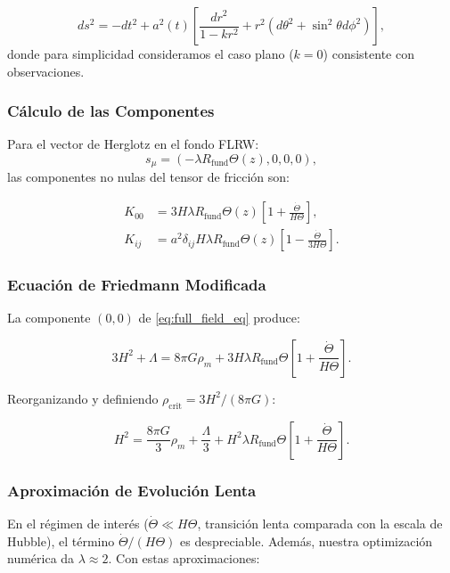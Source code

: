 \documentclass[12pt, a4paper]{article}
\theoremstyle{plain}
\theoremstyle{definition}
\begin{document}
\begin{equation}
ds^2 = -dt^2 + a^2(t) \left[ \frac{dr^2}{1 - kr^2} + r^2(d\theta^2 + \sin^2\theta d\phi^2) \right],
\end{equation}
donde para simplicidad consideramos el caso plano ($k=0$) consistente con observaciones.

\subsubsection{Cálculo de las Componentes}

Para el vector de Herglotz en el fondo FLRW:
\begin{equation}
s_\mu = (-\lambda R_{\text{fund}} \Theta(z), 0, 0, 0),
\end{equation}
las componentes no nulas del tensor de fricción son:

\begin{align}
K_{00} &= 3H \lambda R_{\text{fund}} \Theta(z) \left[ 1 + \frac{\dot{\Theta}}{H\Theta} \right], \\
K_{ij} &= a^2 \delta_{ij} H \lambda R_{\text{fund}} \Theta(z) \left[ 1 - \frac{\dot{\Theta}}{3H\Theta} \right].
\end{align}

\subsubsection{Ecuación de Friedmann Modificada}

La componente $(0,0)$ de \eqref{eq:full_field_eq} produce:

\begin{equation}
3H^2 + \Lambda = 8\pi G \rho_m + 3H \lambda R_{\text{fund}} \Theta \left[ 1 + \frac{\dot{\Theta}}{H\Theta} \right].
\end{equation}

Reorganizando y definiendo $\rho_{\text{crit}} = 3H^2/(8\pi G)$:

\begin{equation}
H^2 = \frac{8\pi G}{3} \rho_m + \frac{\Lambda}{3} + H^2 \lambda R_{\text{fund}} \Theta \left[ 1 + \frac{\dot{\Theta}}{H\Theta} \right].
\label{eq:friedmann_intermediate}
\end{equation}

\subsubsection{Aproximación de Evolución Lenta}

En el régimen de interés ($\dot{\Theta} \ll H\Theta$, transición lenta comparada con la escala de Hubble), el término $\dot{\Theta}/(H\Theta)$ es despreciable. Además, nuestra optimización numérica da $\lambda \approx 2$. Con estas aproximaciones:
\end{document}
